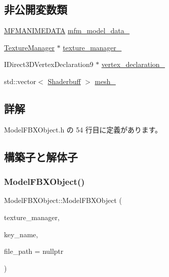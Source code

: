 \subsection*{非公開変数類}
\begin{DoxyCompactItemize}
\item 
\mbox{\hyperlink{class_model_f_b_x_object_1_1_m_f_m_a_n_i_m_e_d_a_t_a}{M\+F\+M\+A\+N\+I\+M\+E\+D\+A\+TA}} \mbox{\hyperlink{class_model_f_b_x_object_a2dd981a6140173ff3ef10f4f6c633a6e}{mfm\+\_\+model\+\_\+data\+\_\+}}
\item 
\mbox{\hyperlink{class_texture_manager}{Texture\+Manager}} $\ast$ \mbox{\hyperlink{class_model_f_b_x_object_ab7f88e9b17a28e644d1967b2e39a450d}{texture\+\_\+manager\+\_\+}}
\item 
I\+Direct3\+D\+Vertex\+Declaration9 $\ast$ \mbox{\hyperlink{class_model_f_b_x_object_a7b592156afe70e5dd416967a44bc1470}{vertex\+\_\+declaration\+\_\+}}
\item 
std\+::vector$<$ \mbox{\hyperlink{struct_model_f_b_x_object_1_1_shaderbuff}{Shaderbuff}} $>$ \mbox{\hyperlink{class_model_f_b_x_object_a3e2d4d9bd6d754a18f3e1bf713ff5012}{mesh\+\_\+}}
\end{DoxyCompactItemize}


\subsection{詳解}


 Model\+F\+B\+X\+Object.\+h の 54 行目に定義があります。



\subsection{構築子と解体子}
\mbox{\label{class_model_f_b_x_object_a45586ead07b17f4a90ba320c41d7f1c3}} 
\subsubsection{\texorpdfstring{Model\+F\+B\+X\+Object()}{ModelFBXObject()}}
{\footnotesize\ttfamily Model\+F\+B\+X\+Object\+::\+Model\+F\+B\+X\+Object (\begin{DoxyParamCaption}\item[{\mbox{\hyperlink{class_texture_manager}{Texture\+Manager}} $\ast$}]{texture\+\_\+manager,  }\item[{const std\+::string $\ast$}]{key\+\_\+name,  }\item[{const std\+::string $\ast$}]{file\+\_\+path = {\ttfamily nullptr} }\end{DoxyParamCaption})}



